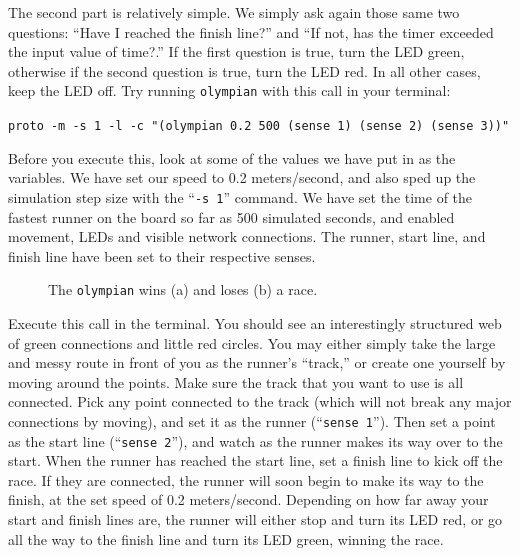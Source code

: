 \documentclass{article}
\newcommand\code[1]{\begin{center}\var{#1}\end{center}}
\newcommand\var[1]{{\tt #1}}
\newcommand\qvar[1]{``{\tt #1}''}
\begin{document}
The second part is relatively simple. We simply ask again those same
two questions: ``Have I reached the finish line?'' and ``If not, has
the timer exceeded the input value of time?.''  If the first question
is true, turn the LED green, otherwise if the second question is true,
turn the LED red.  In all other cases, keep the LED off.  Try running
\var{olympian} with this call in your terminal:

\code{proto -m -s 1 -l -c "(olympian 0.2 500 (sense 1) (sense 2) (sense 3))"}

Before you execute this, look at some of the values we have put in as
the variables. We have set our speed to 0.2 meters/second, and also
sped up the simulation step size with the \qvar{-s 1} command.  We
have set the time of the fastest runner on the board so far as 500
simulated seconds, and enabled movement, LEDs and visible network
connections.  The runner, start line, and finish line have been set to
their respective senses.

\begin{figure}[th]
\centering
{}
\caption{The \var{olympian} wins (a) and loses (b) a race.}
\end{figure}


Execute this call in the terminal. You should see an interestingly
structured web of green connections and little red circles.  You may
either simply take the large and messy route in front of you as the
runner's ``track,'' or create one yourself by moving around the
points.  Make sure the track that you want to use is all connected.
Pick any point connected to the track (which will not break any major
connections by moving), and set it as the runner (\qvar{sense 1}).
Then set a point as the start line (\qvar{sense 2}), and watch as the
runner makes its way over to the start.  When the runner has reached
the start line, set a finish line to kick off the race.  If they are
connected, the runner will soon begin to make its way to the finish,
at the set speed of 0.2 meters/second.  Depending on how far away your
start and finish lines are, the runner will either stop and turn its
LED red, or go all the way to the finish line and turn its LED green,
winning the race.
\end{document}
